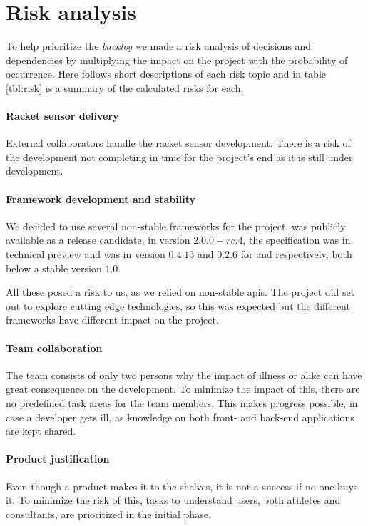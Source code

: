 \chapter{Risk analysis}
To help prioritize the \textit{backlog} we made a risk analysis of decisions and dependencies by multiplying the impact on the project with the probability of occurrence. 
Here follows short descriptions of each risk topic and in table \ref{tbl:risk} is a summary of the calculated risks for each.

\subsubsection*{Racket sensor delivery}
External collaborators handle the racket sensor development.
There is a risk of the development not completing in time for the project's end as it is still under development.

\subsubsection*{Framework development and stability}
We decided to use several non-stable frameworks for the project.
 was publicly available as a release candidate, in version $2.0.0-rc.4$, the  specification was in technical preview and  was in version $0.4.13$ and $0.2.6$ for  and  respectively, both below a stable version $1.0$.

All these posed a risk to us, as we relied on non-stable \glspl{api}.
The project did set out to explore cutting edge technologies, so this was expected but the different frameworks have different impact on the project.

\subsubsection*{Team collaboration}
The team consists of only two persons why the impact of illness or alike can have great consequence on the development.
To minimize the impact of this, there are no predefined task areas for the team members.
This makes progress possible, in case a developer gets ill, as knowledge on both front- and back-end applications are kept shared.

\subsubsection*{Product justification}
Even though a product makes it to the shelves, it is not a success if no one buys it.
To minimize the risk of this, tasks to understand users, both athletes and consultants, are prioritized in the initial phase.

